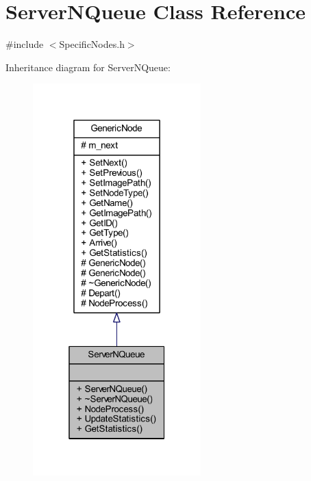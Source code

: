 \hypertarget{class_server_n_queue}{}\section{Server\+N\+Queue Class Reference}
\label{class_server_n_queue}


{\ttfamily \#include $<$Specific\+Nodes.\+h$>$}



Inheritance diagram for Server\+N\+Queue\+:
\nopagebreak
\begin{figure}[H]
\begin{center}
\leavevmode
\includegraphics[width=184pt]{class_server_n_queue__inherit__graph}
\end{center}
\end{figure}


